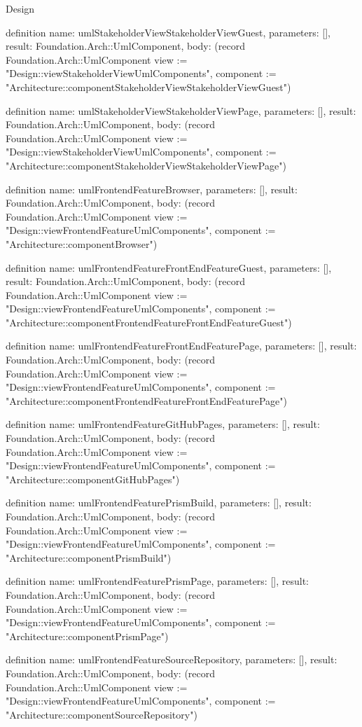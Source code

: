 \begin{lexlean}{Design}
\begin{semanticmodule}
definition{
  name: umlStakeholderViewStakeholderViewGuest,
  parameters: [],
  result: Foundation.Arch::UmlComponent,
  body: (record Foundation.Arch::UmlComponent {view := "Design::viewStakeholderViewUmlComponents", component := "Architecture::componentStakeholderViewStakeholderViewGuest"})
}

definition{
  name: umlStakeholderViewStakeholderViewPage,
  parameters: [],
  result: Foundation.Arch::UmlComponent,
  body: (record Foundation.Arch::UmlComponent {view := "Design::viewStakeholderViewUmlComponents", component := "Architecture::componentStakeholderViewStakeholderViewPage"})
}

definition{
  name: umlFrontendFeatureBrowser,
  parameters: [],
  result: Foundation.Arch::UmlComponent,
  body: (record Foundation.Arch::UmlComponent {view := "Design::viewFrontendFeatureUmlComponents", component := "Architecture::componentBrowser"})
}

definition{
  name: umlFrontendFeatureFrontEndFeatureGuest,
  parameters: [],
  result: Foundation.Arch::UmlComponent,
  body: (record Foundation.Arch::UmlComponent {view := "Design::viewFrontendFeatureUmlComponents", component := "Architecture::componentFrontendFeatureFrontEndFeatureGuest"})
}

definition{
  name: umlFrontendFeatureFrontEndFeaturePage,
  parameters: [],
  result: Foundation.Arch::UmlComponent,
  body: (record Foundation.Arch::UmlComponent {view := "Design::viewFrontendFeatureUmlComponents", component := "Architecture::componentFrontendFeatureFrontEndFeaturePage"})
}

definition{
  name: umlFrontendFeatureGitHubPages,
  parameters: [],
  result: Foundation.Arch::UmlComponent,
  body: (record Foundation.Arch::UmlComponent {view := "Design::viewFrontendFeatureUmlComponents", component := "Architecture::componentGitHubPages"})
}

definition{
  name: umlFrontendFeaturePrismBuild,
  parameters: [],
  result: Foundation.Arch::UmlComponent,
  body: (record Foundation.Arch::UmlComponent {view := "Design::viewFrontendFeatureUmlComponents", component := "Architecture::componentPrismBuild"})
}

definition{
  name: umlFrontendFeaturePrismPage,
  parameters: [],
  result: Foundation.Arch::UmlComponent,
  body: (record Foundation.Arch::UmlComponent {view := "Design::viewFrontendFeatureUmlComponents", component := "Architecture::componentPrismPage"})
}

definition{
  name: umlFrontendFeatureSourceRepository,
  parameters: [],
  result: Foundation.Arch::UmlComponent,
  body: (record Foundation.Arch::UmlComponent {view := "Design::viewFrontendFeatureUmlComponents", component := "Architecture::componentSourceRepository"})
}


\end{semanticmodule}
\end{lexlean}
